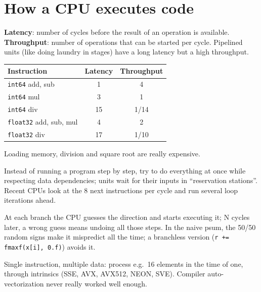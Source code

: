 \documentclass[11pt,a4paper,openany]{book}
\begin{document}
\section{How a CPU executes code}

\begin{defnbox}[title=Latency and throughput]
\textbf{Latency}: number of cycles before the result of an operation is available.
\textbf{Throughput}: number of operations that can be started per cycle. Pipelined units (like
doing laundry in stages) have a long latency but a high throughput.
\end{defnbox}

\begin{propbox}[title={Intel ``Ice Lake'' (1 cycle at 3 GHz = 0.33 ns)}]
\begin{center}
\begin{tabular}{l|cc}
Instruction & Latency & Throughput \\ \hline
\texttt{int64} add, sub & 1 & 4 \\
\texttt{int64} mul & 3 & 1 \\
\texttt{int64} div & 15 & 1/14 \\
\texttt{float32} add, sub, mul & 4 & 2 \\
\texttt{float32} div & 17 & 1/10
\end{tabular}
\end{center}
Loading memory, division and square root are really expensive.
\end{propbox}


\begin{defnbox}[title=Superscalar execution (Tomasulo's algorithm)]
Instead of running a program step by step, try to do everything at once while respecting data
dependencies; units wait for their inputs in ``reservation stations''. Recent CPUs look at the 8
next instructions per cycle and run several loop iterations ahead.
\end{defnbox}

\begin{defnbox}[title=Branch prediction]
At each branch the CPU guesses the direction and starts executing it; N cycles later, a wrong
guess means undoing all those steps. In the naive psum, the 50/50 random signs make it
mispredict all the time; a branchless version (\texttt{r += fmaxf(x[i], 0.f)}) avoids it.
\end{defnbox}


\begin{defnbox}[title=SIMD]
Single instruction, multiple data: process e.g.\ 16 elements in the time of one, through
intrinsics (SSE, AVX, AVX512, NEON, SVE). Compiler auto-vectorization never really worked well
enough.
\end{defnbox}
\end{document}
